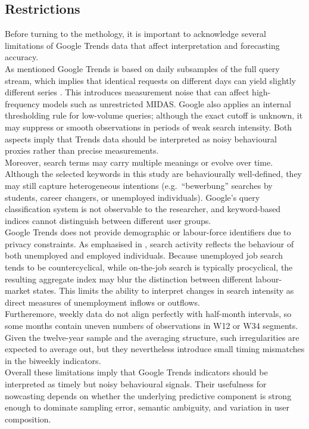 \documentclass[12pt,a4paper]{article}
\begin{document}
\newpage



\subsection{Restrictions}
Before turning to the methology, it is important to acknowledge several 
limitations of Google Trends data that affect interpretation and forecasting accuracy.
\\ As mentioned Google Trends is based on daily subsamples of the full query stream, which implies that 
identical requests on different days can yield slightly different series 
\citep{carrier}. 
This introduces measurement noise that can affect high-frequency models such as 
unrestricted MIDAS. Google also applies an internal thresholding rule for low-volume 
queries; although the exact cutoff is unknown, it may suppress or smooth observations 
in periods of weak search intensity. 
Both aspects imply that Trends data should be interpreted as noisy behavioural proxies 
rather than precise measurements.\\
Moreover, search terms may carry multiple meanings or evolve over time. 
Although the selected keywords in this study are behaviourally well-defined, 
they may still capture heterogeneous intentions (e.g.\ “bewerbung” searches by students, 
career changers, or unemployed individuals). 
Google’s query classification system is not observable to the researcher, and 
keyword-based indices cannot distinguish between different user groups.\\
Google Trends does not provide demographic or labour-force identifiers due to privacy 
constraints. 
As emphasised in \citet{D'Amuri2010Google}, search activity reflects the behaviour of both 
unemployed and employed individuals. 
Because unemployed job search tends to be countercyclical, while on-the-job search is 
typically procyclical, the resulting aggregate index may blur the distinction between 
different labour-market states. 
This limits the ability to interpret changes in search intensity as direct measures of 
unemployment inflows or outflows.\\
Furtheremore, weekly data do not align perfectly with half-month intervals, so some months contain 
uneven numbers of observations in W12 or W34 segments. 
Given the twelve-year sample and the averaging structure, such irregularities are 
expected to average out, but they nevertheless introduce small timing mismatches in the 
biweekly indicators.
\\
Overall these limitations imply that Google Trends indicators should be interpreted 
as timely but noisy behavioural signals. Their usefulness for nowcasting depends on whether the underlying predictive component 
is strong enough to dominate sampling error, semantic ambiguity, and variation in user 
composition.
\end{document}
